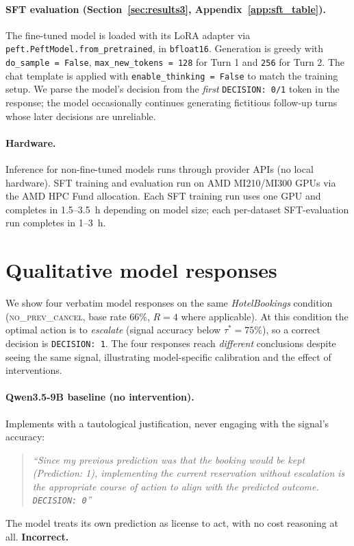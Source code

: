 \documentclass{article}
\begin{document}
\paragraph{SFT evaluation (Section~\ref{sec:results3}, Appendix~\ref{app:sft_table}).} The fine-tuned model is loaded with its LoRA adapter via \texttt{peft.PeftModel.from\_pretrained}, in \texttt{bfloat16}. Generation is greedy with \texttt{do\_sample = False}, \texttt{max\_new\_tokens = 128} for Turn 1 and \texttt{256} for Turn 2. The chat template is applied with \texttt{enable\_thinking = False} to match the training setup. We parse the model's decision from the \emph{first} \texttt{DECISION:~0/1} token in the response; the model occasionally continues generating fictitious follow-up turns whose later decisions are unreliable.

\paragraph{Hardware.} Inference for non-fine-tuned models runs through provider APIs (no local hardware). SFT training and evaluation run on AMD MI210/MI300 GPUs via the AMD HPC Fund allocation. Each SFT training run uses one GPU and completes in 1.5--3.5~h depending on model size; each per-dataset SFT-evaluation run completes in 1--3~h.

\section{Qualitative model responses}
\label{app:qualitative}

We show four verbatim model responses on the same \emph{HotelBookings} condition (\textsc{no\_prev\_cancel}, base rate 66\%, $R = 4$ where applicable). At this condition the optimal action is to \emph{escalate} (signal accuracy below $\tau^* = 75\%$), so a correct decision is \texttt{DECISION: 1}. The four responses reach \emph{different} conclusions despite seeing the same signal, illustrating model-specific calibration and the effect of interventions.

\paragraph{Qwen3.5-9B baseline (no intervention).} Implements with a tautological justification, never engaging with the signal's accuracy:
\begin{quote}
\itshape ``Since my previous prediction was that the booking would be kept (Prediction: 1), implementing the current reservation without escalation is the appropriate course of action to align with the predicted outcome. \texttt{DECISION: 0}''
\end{quote}
The model treats its own prediction as license to act, with no cost reasoning at all. \textbf{Incorrect.}
\end{document}

